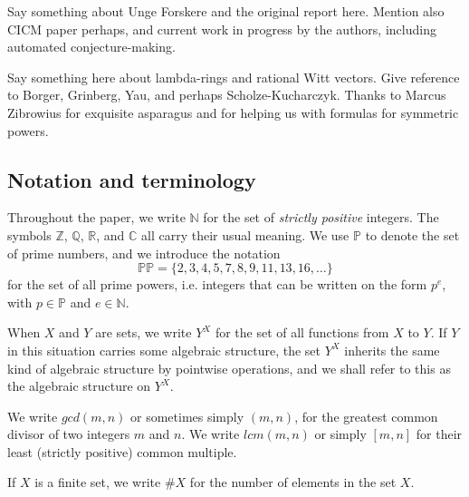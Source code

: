 \documentclass[a4paper]{article}
\begin{document}
Say something about Unge Forskere and the original report here. Mention also CICM paper perhaps, and current work in progress by the authors, including automated conjecture-making. 

Say something here about lambda-rings and rational Witt vectors. Give reference to Borger, Grinberg, Yau, and perhaps Scholze-Kucharczyk. Thanks to Marcus Zibrowius for exquisite asparagus and for helping us with formulas for symmetric powers.


\subsection{Notation and terminology}

Throughout the paper, we write $\mathbb{N}$ for the set of \emph{strictly positive} integers. The symbols $\mathbb{Z}$, $\mathbb{Q}$, $\mathbb{R}$, and $\mathbb{C}$ all carry their usual meaning. We use $\mathbb{P}$ to denote the set of prime numbers, and we introduce the notation
$$ \mathbb{PP} = \{ 2, 3, 4, 5, 7, 8, 9, 11, 13, 16, \ldots  \}  $$
for the set of all prime powers, i.e. integers that can be written on the form $p^e$, with $p \in \mathbb{P}$ and $e \in \mathbb{N}$.

When $X$ and $Y$ are sets, we write $Y^X$ for the set of all functions from $X$ to $Y$. If $Y$ in this situation carries some algebraic structure, the set $Y^X$ inherits the same kind of algebraic structure by pointwise operations, and we shall refer to this as the  algebraic structure on $Y^X$.

We write $gcd(m, n)$ or sometimes simply $(m, n)$, for the greatest common divisor of two integers $m$ and $n$. We write $lcm(m, n)$ or simply $[m ,n]$ for their least (strictly positive) common multiple.

If $X$ is a finite set, we write $\# X$ for the number of elements in the set $X$. 
\end{document}
